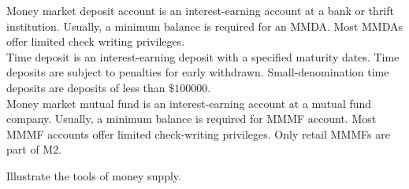 \documentclass[12pt]{article}
\begin{document}
\begin{soln}
	Money market deposit account is an interest-earning account at a bank or thrift institution. Usually, a minimum balance is required for an MMDA. Most MMDAs offer limited check writing privileges.\\

	Time deposit is an interest-earning deposit with a specified maturity dates. Time deposits are subject to penalties for early withdrawn. Small-denomination time deposits are deposits of less than $ \$100000 $.\\

	Money market mutual fund is an interest-earning account at a mutual fund company. Usually, a minimum balance is required for MMMF account. Most MMMF accounts offer limited check-writing privileges. Only retail MMMFs are part of M2.
\end{soln}
\newpage
\begin{prob}
	Illustrate the tools of money supply.
\end{prob}
\end{document}
